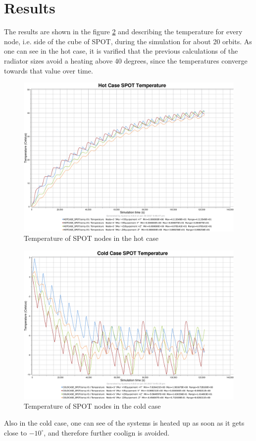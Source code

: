 \section{Results}
The results are shown in the figure \ref{fig:spothot} and describing the temperature for every node, i.e. side of the cube of SPOT, during the simulation for about 20 orbits. As one can see in the hot case, it is varified that the previous calculations of the radiator sizes avoid a heating above 40 degrees, since the temperatures converge towards that value over time. 
\begin{figure}[H]
	\centering
	\includegraphics[scale=0.15]{images/SPOT_hotcase_temperature.png}
	\caption{Temperature of SPOT nodes in the hot case}
	\label{fig:spothot}
\end{figure}

\begin{figure}[H]
	\centering
	\includegraphics[scale=0.15]{images/SPOT_coldcase_temperature.png}
	\caption{Temperature of SPOT nodes in the cold case}
	\label{fig:spothot}
\end{figure}


Also in the cold case, one can see of the systems is heated up as soon as it gets close to $-10^{\circ}$, and therefore further coolign is avoided.
